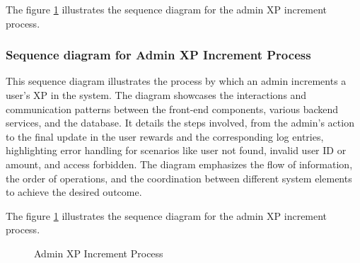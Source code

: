 \noindent The figure \ref{fig:admin-xp-increment-process} illustrates the sequence diagram for the admin XP increment process.

\subsubsection{Sequence diagram for Admin XP Increment Process}

This sequence diagram illustrates the process by which an admin increments a user's XP in the system. The diagram showcases the interactions and communication patterns between the front-end components, various backend services, and the database. It details the steps involved, from the admin's action to the final update in the user rewards and the corresponding log entries, highlighting error handling for scenarios like user not found, invalid user ID or amount, and access forbidden. The diagram emphasizes the flow of information, the order of operations, and the coordination between different system elements to achieve the desired outcome.

\noindent The figure \ref{fig:admin-xp-increment-process} illustrates the sequence diagram for the admin XP increment process.

\begin{landscape}
    \begin{figure}[H]
        \centering
        \caption{Admin XP Increment Process}
        \label{fig:admin-xp-increment-process}
    \end{figure}
\end{landscape}

